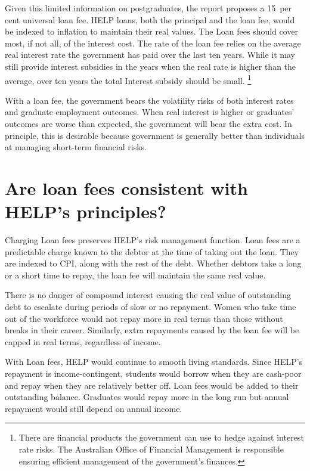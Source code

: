 \documentclass{grattan}
\begin{document}
Given this limited information on postgraduates, the report proposes a 15~per cent universal loan fee.
\gls{HELP} loans, both the principal and the loan fee, would be indexed to inflation to maintain their real values.
The \gls{Loan fees} should cover most, if not all, of the interest cost.
The rate of the loan fee relies on the average real interest rate the government has paid over the last ten years.
While it may still provide interest subsidies in the years when the real rate is higher than the average, over ten years the total \gls{Interest subsidy} should be small.%
   \footnote{There are financial products the government can use to hedge against interest rate risks.
The Australian Office of Financial Management is responsible ensuring efficient management of the government's finances.}

With a loan fee, the government bears the volatility risks of both interest rates and graduate employment outcomes.
When real interest is higher or graduates' outcomes are worse than expected, the government will bear the extra cost.
In principle, this is desirable because government is generally better than individuals at managing short-term financial risks.

\section[Are loan fees consistent with {HELP}'s principles?]{Are loan fees consistent with \gls{HELP}'s principles?}\label{are-loan-fees-consistent-with-helps-principles}

Charging \gls{Loan fees} preserves \gls{HELP}'s risk management function. %
\setlength{\currentparskip}{\parskip}\begingroup\setlength{\parskip}{0.7\baselineskip}%
\Gls{Loan fees} are a predictable charge known to the debtor at the time of taking out the loan.
They are indexed to \gls{CPI}, along with the rest of the debt.
Whether debtors take a long or a short time to repay, the loan fee will maintain the same real value.

There is no danger of compound interest causing the real value of outstanding debt to escalate during periods of slow or no repayment.
Women who take time out of the workforce would not repay more in real terms than those without breaks in their career. %
Similarly, extra repayments caused by the loan fee will be capped in real terms, regardless of income.

With \gls{Loan fees}, \gls{HELP} would continue to smooth living standards.
Since \gls{HELP}'s repayment is income-contingent, students would borrow when they are cash-poor and repay when they are relatively better off.
\Gls{Loan fees} would be added to their outstanding balance.
Graduates would repay more in the long run but annual repayment would still depend on annual income.
\end{document}
